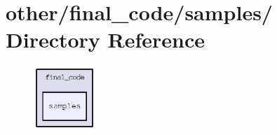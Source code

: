 \section{other/final\_\-code/samples/ Directory Reference}
\label{dir_e06dd446b37134ed9ef463d505a6badc}


\begin{figure}[H]
\begin{center}
\leavevmode
\includegraphics[width=66pt]{dir_e06dd446b37134ed9ef463d505a6badc_dep}
\end{center}
\end{figure}
